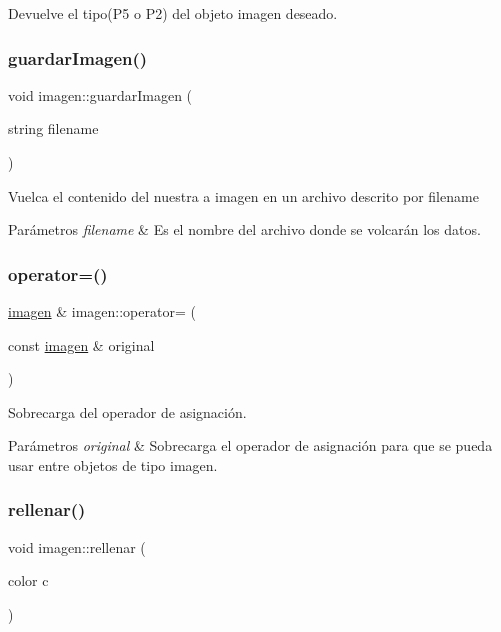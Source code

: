 Devuelve el tipo(\+P5 o P2) del objeto imagen deseado. \mbox{\label{classimagen_a92e9aee45eb7aa937a5537e8bde79fcd}} 
\subsubsection{\texorpdfstring{guardar\+Imagen()}{guardarImagen()}}
{\footnotesize\ttfamily void imagen\+::guardar\+Imagen (\begin{DoxyParamCaption}\item[{string}]{filename }\end{DoxyParamCaption})}

Vuelca el contenido del nuestra a imagen en un archivo descrito por filename 
\begin{DoxyParams}{Parámetros}
{\em filename} & Es el nombre del archivo donde se volcarán los datos. \\
\hline
\end{DoxyParams}
\mbox{\label{classimagen_a7367b737677651301f6d55ac74600231}} 
\subsubsection{\texorpdfstring{operator=()}{operator=()}}
{\footnotesize\ttfamily \mbox{\hyperlink{classimagen}{imagen}} \& imagen\+::operator= (\begin{DoxyParamCaption}\item[{const \mbox{\hyperlink{classimagen}{imagen}} \&}]{original }\end{DoxyParamCaption})}

Sobrecarga del operador de asignación. 
\begin{DoxyParams}{Parámetros}
{\em original} & Sobrecarga el operador de asignación para que se pueda usar entre objetos de tipo imagen. \\
\hline
\end{DoxyParams}
\mbox{\label{classimagen_aafa7e744462222463dcb86ef29a4b2f3}} 
\subsubsection{\texorpdfstring{rellenar()}{rellenar()}}
{\footnotesize\ttfamily void imagen\+::rellenar (\begin{DoxyParamCaption}\item[{color}]{c }\end{DoxyParamCaption})}

